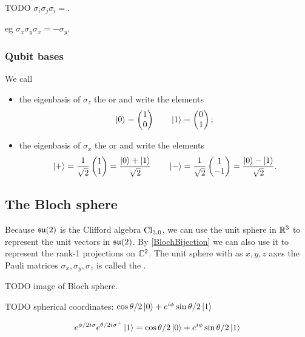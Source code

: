 \begin{corollary}
TODO $\sigma_i\sigma_j\sigma_i = $.
\end{corollary}
eg $\sigma_x\sigma_y\sigma_x = -\sigma_y$.

\subsubsection{Qubit bases}
\begin{definition}
We call
\begin{itemize}
\item the eigenbasis of $\sigma_z$ the  or  and write the elements
\[ \left| 0 \right\rangle = \begin{pmatrix}
1 \\ 0
\end{pmatrix} \qquad \left| 1 \right\rangle = \begin{pmatrix}
0 \\ 1
\end{pmatrix}; \]
\item the eigenbasis of $\sigma_x$ the  or  and write the elements
\[ \left| + \right\rangle = \frac{1}{\sqrt{2}}\begin{pmatrix}
1 \\ 1
\end{pmatrix} = \frac{\left| 0 \right\rangle + \left| 1 \right\rangle}{\sqrt{2}} \qquad \left| - \right\rangle = \frac{1}{\sqrt{2}}\begin{pmatrix}
1 \\ -1
\end{pmatrix} = \frac{\left| 0 \right\rangle - \left| 1 \right\rangle}{\sqrt{2}}. \]
\end{itemize}
\end{definition}

\subsection{The Bloch sphere}
Because $\operatorname{\mathfrak{su}}(2)$ is the Clifford algebra $\operatorname{Cl}_{3,0}$, we can use the unit sphere in $\mathbb{R}^3$ to represent the unit vectors in $\operatorname{\mathfrak{su}}(2)$. By \ref{BlochBijection} we can also use it to represent the rank-1 projections on $\mathbb{C}^2$. The unit sphere with as $x,y,z$ axes the Pauli matrices $\sigma_x,\sigma_y, \sigma_z$ is called the .

TODO image of Bloch sphere.

TODO spherical coordinates: $\cos\theta / 2\left| 0 \right\rangle + e^{i\phi}\sin\theta/2 \left| 1 \right\rangle$
\begin{lemma}
\[ e^{\phi/2 i\sigma}e^{\theta/2 i\sigma^\perp}\left| 1 \right\rangle = \cos\theta / 2\left| 0 \right\rangle + e^{i\phi}\sin\theta/2 \left| 1 \right\rangle \]
\end{lemma}


